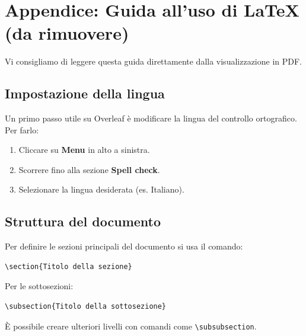 \documentclass{00-settings/document}
\begin{document}

\appendix
\section{Appendice: Guida all'uso di \LaTeX{} (da rimuovere)}
Vi consigliamo di leggere questa guida direttamente dalla visualizzazione in PDF. 

\subsection*{Impostazione della lingua}
Un primo passo utile su Overleaf è modificare la lingua del controllo ortografico. Per farlo:

\begin{enumerate}
    \item Cliccare su \textbf{Menu} in alto a sinistra.
    \item Scorrere fino alla sezione \textbf{Spell check}.
    \item Selezionare la lingua desiderata (es. Italiano).
\end{enumerate}

\subsection*{Struttura del documento}
Per definire le sezioni principali del documento si usa il comando:
\begin{verbatim}
\section{Titolo della sezione}
\end{verbatim}

Per le sottosezioni:
\begin{verbatim}
\subsection{Titolo della sottosezione}
\end{verbatim}

È possibile creare ulteriori livelli con comandi come \verb|\subsubsection|.
\end{document}
